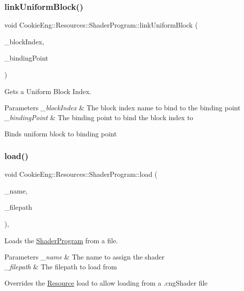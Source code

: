 \subsubsection{\texorpdfstring{link\+Uniform\+Block()}{linkUniformBlock()}}
{\footnotesize\ttfamily void Cookie\+Eng\+::\+Resources\+::\+Shader\+Program\+::link\+Uniform\+Block (\begin{DoxyParamCaption}\item[{const std\+::string \&}]{\+\_\+block\+Index,  }\item[{G\+Luint}]{\+\_\+binding\+Point }\end{DoxyParamCaption})}



Gets a Uniform Block Index. 


\begin{DoxyParams}{Parameters}
{\em \+\_\+block\+Index} & The block index name to bind to the binding point \\
\hline
{\em \+\_\+binding\+Point} & The binding point to bind the block index to\\
\hline
\end{DoxyParams}
Binds uniform block to binding point \mbox{\label{class_cookie_eng_1_1_resources_1_1_shader_program_aef29916bad667d1f820053fd891d9e58}} 
\subsubsection{\texorpdfstring{load()}{load()}}
{\footnotesize\ttfamily void Cookie\+Eng\+::\+Resources\+::\+Shader\+Program\+::load (\begin{DoxyParamCaption}\item[{const std\+::string \&}]{\+\_\+name,  }\item[{const std\+::string \&}]{\+\_\+filepath }\end{DoxyParamCaption})\hspace{0.3cm}{\ttfamily [override]}, {\ttfamily [virtual]}}



Loads the \hyperlink{class_cookie_eng_1_1_resources_1_1_shader_program}{Shader\+Program} from a file. 


\begin{DoxyParams}{Parameters}
{\em \+\_\+name} & The name to assign the shader \\
\hline
{\em \+\_\+filepath} & The filepath to load from\\
\hline
\end{DoxyParams}
Overrides the \hyperlink{class_cookie_eng_1_1_resources_1_1_resource}{Resource} load to allow loading from a .cng\+Shader file 

